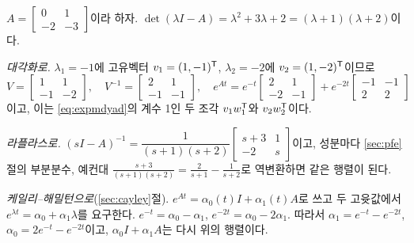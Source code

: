 \documentclass[11pt]{article}
\begin{document}
\begin{example}[행렬지수 하나, 세 가지 방법]\label{ex:expm3}
$A=\begin{bmatrix}0&1\\-2&-3\end{bmatrix}$이라 하자.
$\det(\lambda I-A)=\lambda^{2}+3\lambda+2=(\lambda+1)(\lambda+2)$이다.

\emph{대각화로.} $\lambda_1=-1$에 고유벡터 $v_1=(1,-1)^{\mathsf{T}}$, $\lambda_2=-2$에
$v_2=(1,-2)^{\mathsf{T}}$이므로
\[
   V=\begin{bmatrix}1&1\\-1&-2\end{bmatrix},\quad
   V^{-1}=\begin{bmatrix}2&1\\-1&-1\end{bmatrix},\quad
   e^{At}=e^{-t}\begin{bmatrix}2&1\\-2&-1\end{bmatrix}
         +e^{-2t}\begin{bmatrix}-1&-1\\2&2\end{bmatrix}
\]
이고, 이는 \eqref{eq:expmdyad}의 계수 1인 두 조각 $v_1w_1^{\mathsf{T}}$와 $v_2w_2^{\mathsf{T}}$이다.

\emph{라플라스로.} $(sI-A)^{-1}=\dfrac{1}{(s+1)(s+2)}\begin{bmatrix}s+3&1\\-2&s\end{bmatrix}$이고,
성분마다 \ref{sec:pfe}절의 부분분수, 예컨대
$\frac{s+3}{(s+1)(s+2)}=\frac{2}{s+1}-\frac{1}{s+2}$로 역변환하면 같은 행렬이 된다.

\emph{케일리--해밀턴으로}(\ref{sec:cayley}절). $e^{At}=\alpha_0(t)I+\alpha_1(t)A$로
쓰고 두 고윳값에서 $e^{\lambda t}=\alpha_0+\alpha_1\lambda$를 요구한다.
$e^{-t}=\alpha_0-\alpha_1$, $e^{-2t}=\alpha_0-2\alpha_1$. 따라서
$\alpha_1=e^{-t}-e^{-2t}$, $\alpha_0=2e^{-t}-e^{-2t}$이고,
$\alpha_0I+\alpha_1A$는 다시 위의 행렬이다.
\end{example}
\end{document}
